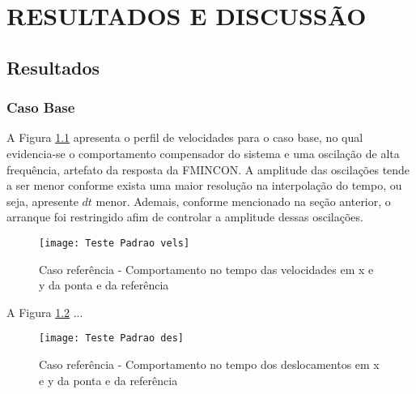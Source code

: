 \chapter{RESULTADOS E DISCUSSÃO}
\section{Resultados}
\subsection{Caso Base}

A Figura \ref{fig:t_padr_vels} apresenta o perfil de velocidades para o caso base, no qual evidencia-se o comportamento compensador do sistema e uma oscilação de alta frequência, artefato da resposta da FMINCON. A amplitude das oscilações tende a ser menor conforme exista uma maior resolução na interpolação do tempo, ou seja, apresente $dt$ menor. Ademais, conforme mencionado na seção anterior, o arranque foi restringido afim de controlar a amplitude dessas oscilações. %


\begin{figure}[htp]
    \begin{center}
    \caption{Caso referência - Comportamento no tempo das velocidades em x e y da ponta e da referência}
    \texttt{[image: Teste Padrao vels]}
    \label{fig:t_padr_vels}
    \end{center}
\end{figure}

A Figura \ref{fig:t_padr_des} ...

\begin{figure}[!htb]
    \begin{center}
    \caption{Caso referência - Comportamento no tempo dos deslocamentos em x e y da ponta e da referência}
    \texttt{[image: Teste Padrao des]}
    \label{fig:t_padr_des}
    \end{center}
\end{figure}

